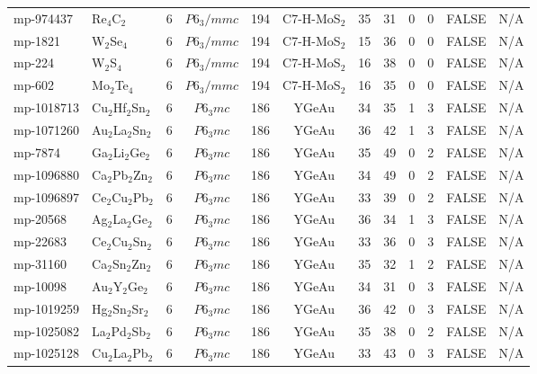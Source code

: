 {\begin{longtable}{llcccccccccc}
    mp-974437 & Re$_{4}$C$_{2}$ & 6     & $P6_3/mmc$ & 194   & C7-H-MoS$_{2}$ & 35    & 31    & 0     & 0     & FALSE & N/A \\
    mp-1821 & W$_{2}$Se$_{4}$ & 6     & $P6_3/mmc$ & 194   & C7-H-MoS$_{2}$ & 15    & 36    & 0     & 0     & FALSE & N/A \\
    mp-224 & W$_{2}$S$_{4}$ & 6     & $P6_3/mmc$ & 194   & C7-H-MoS$_{2}$ & 16    & 38    & 0     & 0     & FALSE & N/A \\
    mp-602 & Mo$_{2}$Te$_{4}$ & 6     & $P6_3/mmc$ & 194   & C7-H-MoS$_{2}$ & 16    & 35    & 0     & 0     & FALSE & N/A \\
    mp-1018713 & Cu$_{2}$Hf$_{2}$Sn$_{2}$ & 6     & $P6_3mc$ & 186   & YGeAu & 34    & 35    & 1     & 3     & FALSE & N/A \\
    mp-1071260 & Au$_{2}$La$_{2}$Sn$_{2}$ & 6     & $P6_3mc$ & 186   & YGeAu & 36    & 42    & 1     & 3     & FALSE & N/A \\
    mp-7874 & Ga$_{2}$Li$_{2}$Ge$_{2}$ & 6     & $P6_3mc$ & 186   & YGeAu & 35    & 49    & 0     & 2     & FALSE & N/A \\
    mp-1096880 & Ca$_{2}$Pb$_{2}$Zn$_{2}$ & 6     & $P6_3mc$ & 186   & YGeAu & 34    & 49    & 0     & 2     & FALSE & N/A \\
    mp-1096897 & Ce$_{2}$Cu$_{2}$Pb$_{2}$ & 6     & $P6_3mc$ & 186   & YGeAu & 33    & 39    & 0     & 2     & FALSE & N/A \\
    mp-20568 & Ag$_{2}$La$_{2}$Ge$_{2}$ & 6     & $P6_3mc$ & 186   & YGeAu & 36    & 34    & 1     & 3     & FALSE & N/A \\
    mp-22683 & Ce$_{2}$Cu$_{2}$Sn$_{2}$ & 6     & $P6_3mc$ & 186   & YGeAu & 33    & 36    & 0     & 3     & FALSE & N/A \\
    mp-31160 & Ca$_{2}$Sn$_{2}$Zn$_{2}$ & 6     & $P6_3mc$ & 186   & YGeAu & 35    & 32    & 1     & 2     & FALSE & N/A \\
    mp-10098 & Au$_{2}$Y$_{2}$Ge$_{2}$ & 6     & $P6_3mc$ & 186   & YGeAu & 34    & 31    & 0     & 3     & FALSE & N/A \\
    mp-1019259 & Hg$_{2}$Sn$_{2}$Sr$_{2}$ & 6     & $P6_3mc$ & 186   & YGeAu & 36    & 42    & 0     & 3     & FALSE & N/A \\
    mp-1025082 & La$_{2}$Pd$_{2}$Sb$_{2}$ & 6     & $P6_3mc$ & 186   & YGeAu & 35    & 38    & 0     & 2     & FALSE & N/A \\
    mp-1025128 & Cu$_{2}$La$_{2}$Pb$_{2}$ & 6     & $P6_3mc$ & 186   & YGeAu & 33    & 43    & 0     & 3     & FALSE & N/A \\

\end{longtable}}
